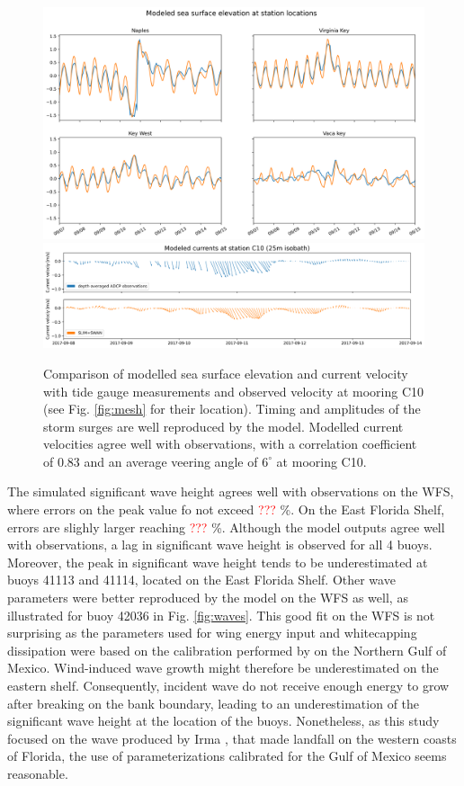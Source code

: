 \documentclass[11pt,a4paper]{article}
\begin{document}
\begin{figure}
    \centering
    \includegraphics[width=.95\textwidth]{fig/elevation_with_map.png}
    \includegraphics[width=.95\textwidth]{fig/validation_currents_C10_ww3.png}
    \caption{Comparison of modelled sea surface elevation and current velocity with tide gauge measurements and observed velocity at mooring C10 (see Fig. \ref{fig:mesh} for their location). Timing and amplitudes of the storm surges are well reproduced by the model. Modelled current velocities agree well with observations, with a correlation coefficient of 0.83 and an average veering angle of $6^\circ$ at mooring C10.}
    \label{fig:hydro}
\end{figure}

The simulated significant wave height agrees well with observations on the WFS, where errors on the peak value fo not exceed \textcolor{red}{???} \%. On the East Florida Shelf, errors are slighly larger reaching \textcolor{red}{???} \%. Although the model outputs agree well with observations, a lag in significant wave height is observed for all 4 buoys. Moreover, the peak in significant wave height tends to be underestimated at buoys 41113 and 41114, located on the East Florida Shelf. Other wave parameters were better reproduced by the model on the WFS as well, as illustrated for buoy 42036 in Fig. \ref{fig:waves}. This good fit on the WFS is not surprising as the parameters used for wing energy input and whitecapping dissipation were based on the calibration performed by \citep{siadatmousavi2011evaluation} on the Northern Gulf of Mexico. Wind-induced wave growth might therefore be underestimated on the eastern shelf. Consequently, incident wave do not receive enough energy to grow after breaking on the bank boundary, leading to an underestimation of the significant wave height at the location of the buoys. Nonetheless, as this study focused on the wave produced by Irma , that made landfall on the western coasts of Florida, the use of parameterizations calibrated for the Gulf of Mexico seems reasonable.
\end{document}
